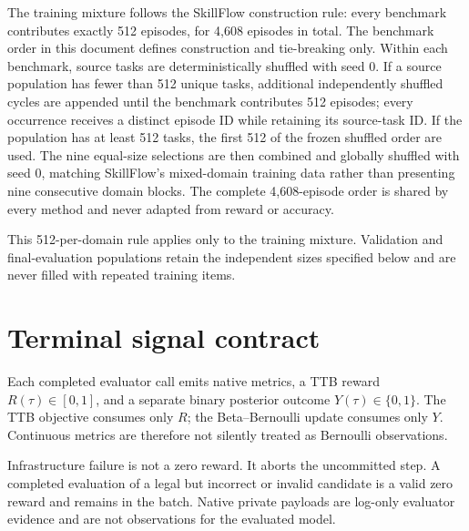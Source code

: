 \documentclass[11pt]{article}
\begin{document}
The training mixture follows the SkillFlow construction rule: every benchmark
contributes exactly 512 episodes, for 4,608 episodes in total.  The benchmark
order in this document defines construction and tie-breaking only.  Within
each benchmark, source tasks are deterministically shuffled with seed 0.  If a
source population has fewer than 512 unique tasks, additional independently
shuffled cycles are appended until the benchmark contributes 512 episodes;
every occurrence receives a distinct episode ID while retaining its
source-task ID.  If the population has at least 512 tasks, the first 512 of the
frozen shuffled order are used.  The nine equal-size selections are then
combined and globally shuffled with seed 0, matching SkillFlow's mixed-domain
training data rather than presenting nine consecutive domain blocks.  The
complete 4,608-episode order is shared by every method and never adapted from
reward or accuracy.

This 512-per-domain rule applies only to the training mixture.  Validation and
final-evaluation populations retain the independent sizes specified below and
are never filled with repeated training items.

\section{Terminal signal contract}

Each completed evaluator call emits native metrics, a TTB reward
$R(\tau)\in[0,1]$, and a separate binary posterior outcome
$Y(\tau)\in\{0,1\}$.  The TTB objective consumes only $R$; the
Beta--Bernoulli update consumes only $Y$.  Continuous metrics are therefore
not silently treated as Bernoulli observations.

Infrastructure failure is not a zero reward.  It aborts the uncommitted step.
A completed evaluation of a legal but incorrect or invalid candidate is a
valid zero reward and remains in the batch.  Native private payloads are
log-only evaluator evidence and are not observations for the evaluated model.
\end{document}
